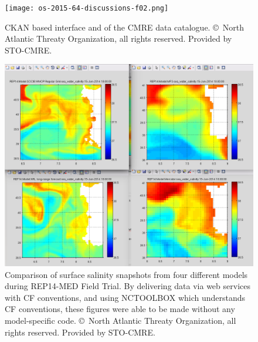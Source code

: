 \documentclass[osd, online, hvmath]{copernicus}
\begin{document}
\begin{figure}
\texttt{[image: os-2015-64-discussions-f02.png]}
\caption{CKAN based interface and of the CMRE data
  catalogue. \copyright~North Atlantic Threaty Organization, all rights reserved. Provided by STO-CMRE.}
\label{osd-2015-0064-f02.pdf}
\end{figure}

\begin{figure}
\includegraphics[width=120mm]{os-2015-64-discussions-f03.png}
\caption{Comparison of surface salinity snapshots from four different
  models during REP14-MED Field Trial. By delivering data via web
  services with CF conventions, and using NCTOOLBOX which understands
  CF conventions, these figures were able to be made without any
  model-specific code.  \copyright~North Atlantic Threaty
  Organization, all rights reserved. Provided by STO-CMRE.}
\label{osd-2015-0064-f03.pdf}
\end{figure}
\end{document}
